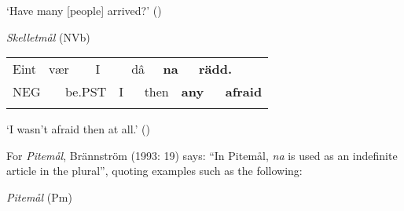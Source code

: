 \begin{styleTranslation}
‘Have many [people] arrived?’ (\citet[43]{Marklund1976})

\end{styleTranslation}

\begin{listWWNumileveli}
\item {}

\begin{styleExample}
\textit{Skelletmål} (NVb)

\end{styleExample}

\end{listWWNumileveli}

\begin{tabular}{llllllllllll}
\lsptoprule
Eint & \multicolumn{2}{l}{vær

} & \multicolumn{2}{l}{I

} & \multicolumn{2}{l}{dâ

} & \multicolumn{2}{l}{{\bfseries na}

} & \multicolumn{2}{l}{{\bfseries rädd.}

} & \\
\multicolumn{2}{l}{NEG

} & \multicolumn{2}{l}{be.PST

} & \multicolumn{2}{l}{I

} & \multicolumn{2}{l}{then

} & \multicolumn{2}{l}{{\bfseries any}

} & \multicolumn{2}{l}{{\bfseries afraid}

}\\
\lspbottomrule
\end{tabular}

\begin{styleTranslation}
‘I wasn’t afraid then at all.’ (\citet[43]{Marklund1976})

\end{styleTranslation}

\begin{styleBodyTextFirst}
For \textit{Pitemål}, Brännström (1993: 19) says: “In Pitemål, \textit{na} is used as an indefinite article in the plural”, quoting examples such as the following:

\end{styleBodyTextFirst}

\begin{listWWNumileveli}
\item {}

\begin{styleExample}
\textit{Pitemål }(Pm)

\end{styleExample}

\end{listWWNumileveli}

